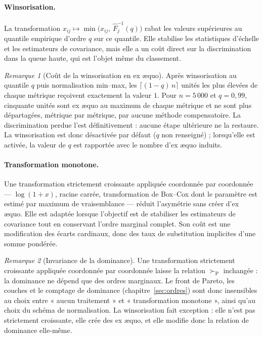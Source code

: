 \documentclass[11pt,a4paper]{article}
\theoremstyle{definition}
\theoremstyle{remark}
\newtheorem{remarque}{Remarque}[section]
\newcommand{\pareto}{\succ_{\mathrm{P}}}
\begin{document}
\bigskip

\paragraph{Winsorisation.} La transformation
$x_{ij} \mapsto \min\!\big(x_{ij},\,\hat{F}_j^{-1}(q)\big)$ rabat les valeurs supérieures
au quantile empirique d'ordre $q$ sur ce quantile. Elle stabilise les statistiques
d'échelle et les estimateurs de covariance, mais elle a un coût direct sur la
discrimination dans la queue haute, qui est l'objet même du classement.

\medskip

\begin{remarque}[Coût de la winsorisation en ex \ae quo]
  \label{rem:winsor}
  Après winsorisation au quantile $q$ puis normalisation min--max, les
  $\lceil (1-q)\,n \rceil$ unités les plus élevées de chaque métrique reçoivent exactement
  la valeur $1$. Pour $n = 5\,000$ et $q = 0{,}99$, cinquante unités sont ex \ae quo au
  maximum de chaque métrique et ne sont plus départagées, métrique par métrique, par aucune
  méthode compensatoire. La discrimination perdue l'est définitivement : aucune étape
  ultérieure ne la restaure. La winsorisation est donc désactivée par défaut ($q$ non
  renseigné) ; lorsqu'elle est activée, la valeur de $q$ est rapportée avec le nombre
  d'ex \ae quo induits.
\end{remarque}

\bigskip

\paragraph{Transformation monotone.} Une transformation strictement croissante appliquée
coordonnée par coordonnée --- $\log(1+x)$, racine carrée, transformation de Box--Cox dont
le paramètre est estimé par maximum de vraisemblance --- réduit l'asymétrie sans créer
d'ex \ae quo. Elle est adaptée lorsque l'objectif est de stabiliser les estimateurs de
covariance tout en conservant l'ordre marginal complet. Son coût est une modification des
écarts cardinaux, donc des taux de substitution implicites d'une somme pondérée.

\bigskip

\begin{remarque}[Invariance de la dominance]
  \label{rem:invariance-front}
  Une transformation strictement croissante appliquée coordonnée par coordonnée laisse la
  relation $\pareto$ inchangée : la dominance ne dépend que des ordres marginaux. Le front
  de Pareto, les couches et le comptage de dominance
  (chapitre~\ref{sec:ordres}) sont donc insensibles au choix entre « aucun traitement » et
  « transformation monotone », ainsi qu'au choix du schéma de normalisation. La
  winsorisation fait exception : elle n'est pas strictement croissante, elle crée des
  ex \ae quo, et elle modifie donc la relation de dominance elle-même.
\end{remarque}
\end{document}
